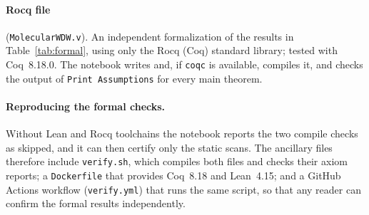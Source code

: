\documentclass[reprint,aps,prd,amsmath,amssymb,superscriptaddress,nofootinbib,floatfix]{revtex4-2}
\theoremstyle{plain}
\theoremstyle{definition}
\theoremstyle{remark}
\begin{document}
\paragraph*{Rocq file} (\texttt{MolecularWDW.v}). An independent formalization of the results in
Table~\ref{tab:formal}, using only the Rocq (Coq) standard library; tested with Coq~8.18.0. The notebook writes and,
if \texttt{coqc} is available, compiles it, and checks the output of \texttt{Print Assumptions} for every main theorem.

\paragraph*{Reproducing the formal checks.} Without Lean and Rocq toolchains the notebook reports the two compile checks
as skipped, and it can then certify only the static scans. The ancillary files therefore include \texttt{verify.sh}, which
compiles both files and checks their axiom reports; a \texttt{Dockerfile} that provides Coq~8.18 and Lean~4.15; and a
GitHub Actions workflow (\texttt{verify.yml}) that runs the same script, so that any reader can confirm the formal results
independently.


\end{document}
